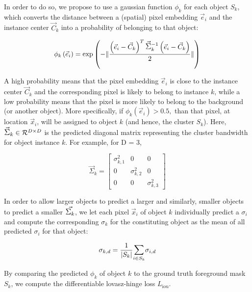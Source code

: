 \documentclass{midl} %
\begin{document}
In order to do so, we propose to use a gaussian function $\phi_{k}$ for each object $S_{k}$, which converts the distance between a (spatial) pixel embedding $\vec{e}_{i}$ and the instance center $\vec{C}_{k}$ into a probability of belonging to that object:

\begin{equation}
\phi_{k} \left( \vec{e}_{i} \right) = \exp \left( -\lVert \frac{ \left( \vec{e}_{i} - \vec{C}_{k} \right)^{T} \mathlarger{\mathlarger{\vec{\Sigma}}}_{k}^{-1} \left( \vec{e}_{i} - \vec{C}_{k} \right)}{2} \rVert \right)    
 \label{eqgauss}
\end{equation}

A high probability means that the pixel embedding $\vec{e}_{i}$ is close to the instance center  $\vec{C}_{k}$ and the corresponding pixel is likely to belong to instance $k$, while a low probability means that the pixel is more likely to belong to the background (or another object). More specifically, if $\phi_{k}(\vec{e}_{i})>0.5,$ than that pixel, at location $\vec{x}_{i}$, will be assigned to object $k$ (and hence, the cluster $S_{k}$). Here, $\mathlarger{\mathlarger{\vec{\Sigma}_{k}}} \in \mathcal{R}^{D \times D}$ is the predicted diagonal matrix representing the cluster bandwidth for object instance $k$. For example, for D = 3, 

\begin{equation}
    \vec{\Sigma}_{k} = \begin{bmatrix}
    \sigma^{2}_{k, 1} & 0 & 0 \\
    0 & \sigma^{2}_{k, 2} & 0 \\
    0 & 0 & \sigma^{2}_{k, 3}
    \end{bmatrix}
\end{equation}

In order to allow larger objects to predict a larger  and similarly, smaller objects to predict a smaller $\mathlarger{\mathlarger{\vec{\Sigma_{k}}}}$, we let each pixel $\vec{x}_{i}$ of object $k$ individually predict a $\sigma_{i}$ and compute the corresponding $\sigma_{k}$ for the constituting object as the mean of all predicted $\sigma_{i}$ for that object:

\begin{equation}
    \sigma_{k, d} = \frac{1}{\vert S_{k} \vert} \mathlarger{\sum}_{i \in S_{k}} \sigma_{i, d}
\end{equation}

By comparing the predicted $\phi_{k}$ of object $k$ to the ground truth foreground mask $S_{k}$, we compute the differentiable lovasz-hinge loss $L_{\text{iou}}$.
\end{document}
